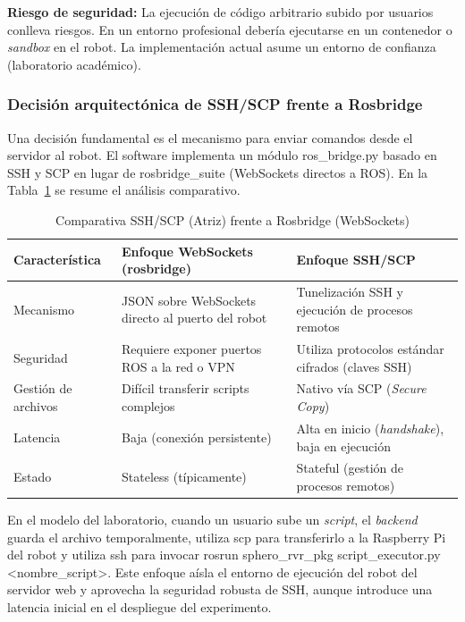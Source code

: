 \documentclass[12pt]{article}
\numberwithin{figure}{section}
\numberwithin{table}{section}
\def\code#1{#1}%
\def\file#1{#1}%
\newcommand{\code}[1]{\textcolor{codeblue}{\url{#1}}}
\newcommand{\file}[1]{\textcolor{darkblue}{\url{#1}}}
\begin{document}
\begin{warningbox}
\textbf{Riesgo de seguridad:} La ejecución de código arbitrario subido por usuarios conlleva riesgos. En un entorno profesional debería ejecutarse en un contenedor o \textit{sandbox} en el robot. La implementación actual asume un entorno de confianza (laboratorio académico).
\end{warningbox}


\subsubsection{Decisión arquitectónica de SSH/SCP frente a Rosbridge}

Una decisión fundamental es el mecanismo para enviar comandos desde el servidor al robot. El software implementa un módulo \file{ros\_bridge.py} basado en SSH y SCP en lugar de \code{rosbridge\_suite} (WebSockets directos a ROS). En la Tabla~\ref{tab:ssh_vs_rosbridge} se resume el análisis comparativo.

\begin{table}[H]
\centering
\caption{Comparativa SSH/SCP (Atriz) frente a Rosbridge (WebSockets)}
\label{tab:ssh_vs_rosbridge}
\begin{tabular}{p{}p{}p{}}
\toprule
\textbf{Característica} & \textbf{Enfoque WebSockets (rosbridge)} & \textbf{Enfoque SSH/SCP} \\
\midrule
Mecanismo & JSON sobre WebSockets directo al puerto del robot & Tunelización SSH y ejecución de procesos remotos \\
Seguridad & Requiere exponer puertos ROS a la red o VPN & Utiliza protocolos estándar cifrados (claves SSH) \\
Gestión de archivos & Difícil transferir scripts complejos & Nativo vía SCP (\textit{Secure Copy}) \\
Latencia & Baja (conexión persistente) & Alta en inicio (\textit{handshake}), baja en ejecución \\
Estado & Stateless (típicamente) & Stateful (gestión de procesos remotos) \\
\bottomrule
\end{tabular}
\end{table}

En el modelo del laboratorio, cuando un usuario sube un \textit{script}, el \textit{backend} guarda el archivo temporalmente, utiliza \code{scp} para transferirlo a la Raspberry Pi del robot y utiliza \code{ssh} para invocar \code{rosrun sphero\_rvr\_pkg script\_executor.py <nombre\_script>}. Este enfoque aísla el entorno de ejecución del robot del servidor web y aprovecha la seguridad robusta de SSH, aunque introduce una latencia inicial en el despliegue del experimento.
\end{document}
